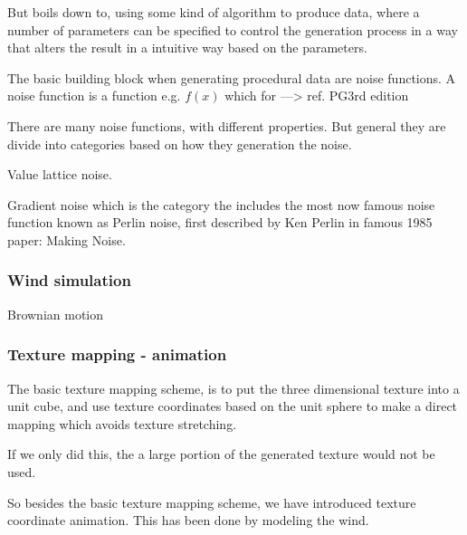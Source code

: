 But boils down to, using some kind of algorithm to produce data, where
a number of parameters can be specified to control the
generation process in a way that alters the result in a intuitive way
based on the parameters.

The basic building block when generating procedural data are noise
functions. A noise function is a function e.g. $f(x)$ which for 
---> ref. PG3rd edition

There are many noise functions, with different properties. But general
they are divide into categories based on how they generation the
noise.

Value lattice noise.

Gradient noise which is the category the includes the most 
now famous noise function known as Perlin noise, first described by Ken
Perlin in famous 1985 paper: Making Noise. 

\subsubsection{Wind simulation}
Brownian motion

\subsubsection{Texture mapping - animation}
The basic texture mapping scheme, is to put the three dimensional
texture into a unit cube, and use texture coordinates based on the
unit sphere to make a direct mapping which avoids texture stretching.

If we only did this, the a large portion of the generated texture
would not be used.

So besides the basic texture mapping scheme, we have introduced
texture coordinate animation. This has been done by modeling the wind.








